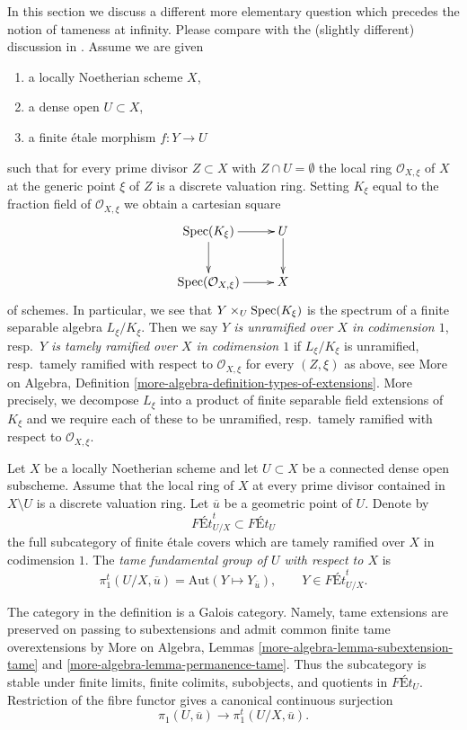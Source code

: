 \medskip\noindent
In this section we discuss a different more elementary question which
precedes the notion of tameness at infinity.
Please compare with the (slightly different)
discussion in \cite{Grothendieck-Murre}.
Assume we are given
\begin{enumerate}
\item a locally Noetherian scheme $X$,
\item a dense open $U \subset X$,
\item a finite \'etale morphism $f : Y \to U$
\end{enumerate}
such that for every prime divisor $Z \subset X$
with $Z \cap U = \emptyset$ the local ring $\mathcal{O}_{X, \xi}$
of $X$ at the generic point $\xi$ of $Z$ is a discrete valuation ring.
Setting $K_\xi$ equal to the fraction field of $\mathcal{O}_{X, \xi}$
we obtain a cartesian square
$$
\xymatrix{
\Spec(K_\xi) \ar[r] \ar[d] & U \ar[d] \\
\Spec(\mathcal{O}_{X, \xi}) \ar[r] & X
}
$$
of schemes. In particular, we see that $Y \times_U \mathop{\mathrm{Spec}}(K_\xi)$
is the spectrum of a finite separable algebra $L_\xi/K_\xi$.
Then we say
{\it $Y$ is unramified over $X$ in codimension $1$},
resp.\ {\it $Y$ is tamely ramified over $X$ in codimension $1$}
if $L_\xi/K_\xi$ is unramified, resp.\ tamely ramified
with respect to $\mathcal{O}_{X, \xi}$ for every $(Z, \xi)$
as above, see More on Algebra, Definition
\ref{more-algebra-definition-types-of-extensions}.
More precisely, we decompose $L_\xi$ into a product of finite
separable field extensions of $K_\xi$ and we require each of these
to be unramified, resp.\ tamely ramified with respect to
$\mathcal{O}_{X, \xi}$.

\begin{definition}
\label{definition-tame-fundamental-group}
Let $X$ be a locally Noetherian scheme and let $U \subset X$ be a connected
dense open subscheme. Assume that the local ring of $X$ at every prime
divisor contained in $X \setminus U$ is a discrete valuation ring. Let
$\overline{u}$ be a geometric point of $U$. Denote by
$$
\textit{F\'Et}^t_{U/X} \subset \textit{F\'Et}_U
$$
the full subcategory of finite \'etale covers which are tamely ramified over
$X$ in codimension $1$. The {\it tame fundamental group of $U$ with respect
to $X$} is
$$
\pi_1^t(U/X, \overline{u}) =
\text{Aut}(Y \mapsto Y_{\overline{u}}),
\qquad Y \in \textit{F\'Et}^t_{U/X}.
$$
\end{definition}

\noindent
The category in the definition is a Galois category. Namely, tame extensions
are preserved on passing to subextensions and admit common finite tame
overextensions by More on Algebra, Lemmas
\ref{more-algebra-lemma-subextension-tame} and
\ref{more-algebra-lemma-permanence-tame}. Thus the subcategory is stable
under finite limits, finite colimits, subobjects, and quotients in
$\textit{F\'Et}_U$. Restriction of the fibre functor gives a canonical
continuous surjection
$$
\pi_1(U, \overline{u}) \longrightarrow
\pi_1^t(U/X, \overline{u}).
$$

